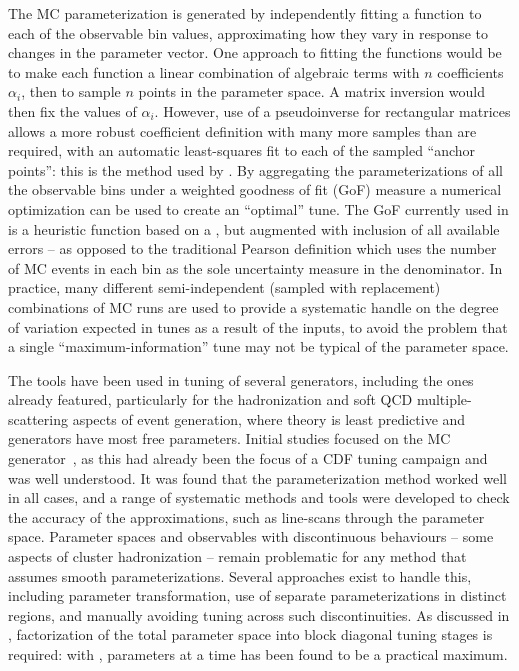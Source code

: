 The MC parameterization is generated by independently fitting a function to each
of the observable bin values, approximating how they vary in response to changes
in the parameter vector. One approach to fitting the functions would be to make
each function a linear combination of algebraic terms with $n$ coefficients
$\alpha_i$, then to sample $n$ points in the parameter space. A matrix inversion
would then fix the values of $\alpha_i$. However, use of a pseudoinverse for
rectangular matrices allows a more robust coefficient definition with many more
samples than are required, with an automatic least-squares fit to each of the
sampled ``anchor points'': this is the method used by \professor. By aggregating
the parameterizations of all the observable bins under a weighted goodness of
fit (GoF) measure a numerical optimization can be used to create an ``optimal''
tune. The GoF currently used in \professor is a heuristic function based on a
\chisq, but augmented with inclusion of all available errors -- as opposed to
the traditional Pearson definition which uses the number of MC events in each
bin as the sole uncertainty measure in the denominator.  In practice, many
different semi-independent (sampled with replacement) combinations of MC runs
are used to provide a systematic handle on the degree of variation expected in
tunes as a result of the inputs, to avoid the problem that a single
``maximum-information'' tune may not be typical of the parameter space.

The \professor tools have been used in tuning of several generators, including
the \mcnet ones already featured, particularly for the hadronization and soft
QCD multiple-scattering aspects of event generation, where theory is least
predictive and generators have most free parameters. Initial studies focused on
the \pythiasix MC generator~\cite{Sjostrand:2006za}, as this had already been
the focus of a CDF tuning campaign and was well understood. It was found that
the parameterization method worked well in all cases, and a range of systematic
methods and tools were developed to check the accuracy of the approximations,
such as line-scans through the parameter space. Parameter spaces and observables
with discontinuous behaviours -- \eg some aspects of cluster hadronization --
remain problematic for any method that assumes smooth parameterizations.
Several approaches exist to handle this, including parameter transformation, use
of separate parameterizations in distinct regions, and manually avoiding tuning
across such discontinuities. As discussed in ,
factorization of the total parameter space into block diagonal tuning stages is
required: with \professor,  parameters at a time has been found to
be a practical maximum.

